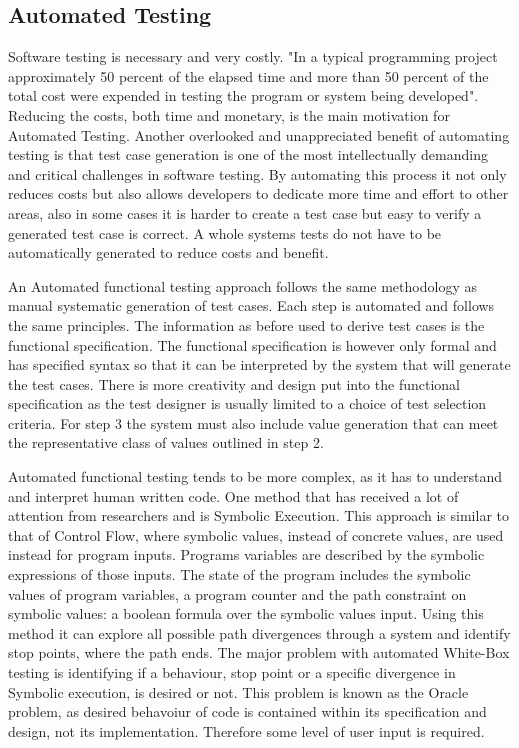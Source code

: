 \documentclass[a4paper,12pt]{article}
\begin{document}
\subsection{Automated Testing}
\par Software testing is necessary and very costly. "In a typical programming project approximately 50 percent of the elapsed time and more than 50 percent of the total cost were expended in testing the program or system being developed"\cite{myers2011art}. Reducing the costs, both time and monetary, is the main motivation for Automated Testing. Another overlooked and unappreciated benefit of automating testing is that test case generation is one of the most intellectually demanding and critical challenges in software testing.\cite{anand2013orchestrated} By automating this process it not only reduces costs but also allows developers to dedicate more time and effort to other areas, also in some cases it is harder to create a test case but easy to verify a generated test case is correct. A whole systems tests do not have to be automatically generated to reduce costs and benefit.
\vspace{3mm}
\par An Automated functional testing approach follows the same methodology as manual systematic generation of test cases. Each step is automated and follows the same principles. The information as before used to derive test cases is the functional specification. The functional specification is however only formal  and has specified syntax so that it can be interpreted by the system that will generate the test cases. There is more creativity and design put into the functional specification as the test designer is usually limited to a choice of test selection criteria. For step 3 the system must also include value generation that can meet the representative class of values outlined in step 2.\cite{young2008software}
\vspace{3mm}
\par Automated functional testing tends to be more complex, as it has to understand and interpret human written code. One method that has received a lot of attention from researchers and is Symbolic Execution. This approach is similar to that of Control Flow, where symbolic values, instead of concrete values, are used instead for program inputs. Programs variables are described by the symbolic expressions of those inputs. The state of the program includes the symbolic values of program variables, a program counter and the path constraint on symbolic values: a boolean formula over the symbolic values input. Using this method it can explore all possible path divergences through a system and identify stop points, where the path ends. The major problem with automated White-Box testing is identifying if a behaviour, stop point or a specific divergence in Symbolic execution, is desired or not. This problem is known as the Oracle problem, as desired behavoiur of code is contained within its specification and design, not its implementation. Therefore some level of user input is required.\cite{anand2013orchestrated}
\end{document}
